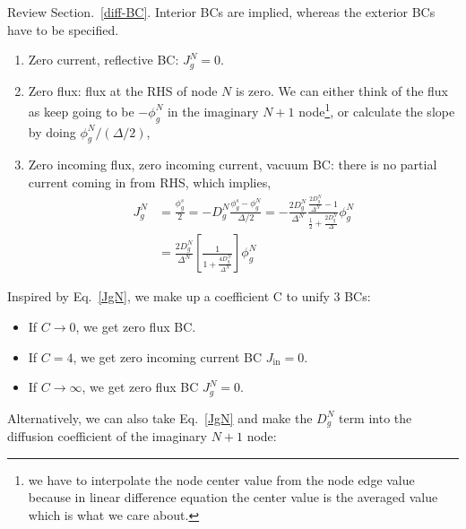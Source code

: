 \documentclass{school-22.211-notes}
\begin{document}
\clearpage
{}
Review Section.~\ref{diff-BC}. Interior BCs are implied, whereas the exterior BCs have to be specified. 
\begin{enumerate}
\item Zero current, reflective BC: $J_g^N = 0$. 

\item Zero flux: flux at the RHS of node $N$ is zero.  We can either think of the flux as keep going to be $-\phi_g^N$ in the imaginary $N+1$ node\footnote{we have to interpolate the node center value from the node edge value because in linear difference equation the center value is the averaged value which is what we care about.}, or calculate the slope by doing $\phi_g^N / (\Delta /2)$,

\item Zero incoming flux, zero incoming current, vacuum BC: there is no partial current coming in from RHS,
which implies,
\begin{align}
  J_g^N &= \frac{\phi_g^s}{2} = -D_g^N \frac{\phi_g^s - \phi_g^N}{\Delta/2} = - \frac{2 D_g^N}{\Delta^N} \frac{\frac{2D_g^N}{\Delta^N} - 1}{\frac{1}{2} + \frac{2D_g^N}{\Delta}} \phi_g^N \\
  &= \frac{2D_g^N}{\Delta^N} \left[ \frac{1}{1 + \frac{4 D_g^{N}}{\Delta^N}} \right] \phi_g^N  \label{JgN}
\end{align}
\end{enumerate}

Inspired by Eq.~\ref{JgN}, we make up a coefficient C to unify 3 BCs: 
\begin{itemize}
\item If $C \to 0$, we get zero flux BC.  
\item If $C = 4$, we get zero incoming current BC $J_{\mathrm{in}} = 0$.
\item If $C \to \infty$, we get zero flux BC $J_g^N = 0$. 
\end{itemize}

Alternatively, we can also take Eq.~\ref{JgN} and make the $D_g^N$ term into the diffusion coefficient of the imaginary $N+1$ node: 
\end{document}
